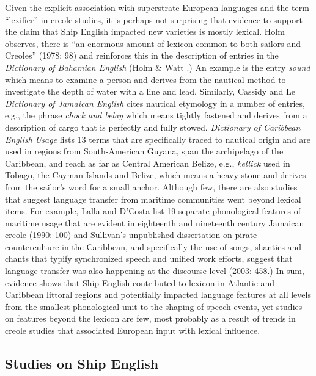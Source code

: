   Given the explicit association with superstrate European languages and the term “lexifier” in creole studies, it is perhaps not surprising that evidence to support the claim that Ship English impacted new varieties is mostly lexical. Holm observes, there is “an enormous amount of lexicon common to both sailors and Creoles” (1978: 98) and reinforces this in the description of entries in the \textit{Dictionary of Bahamian English} (Holm \& Watt \citealt{Schilling1982}.) An example is the entry \textit{sound} which means to examine a person and derives from the nautical method to investigate the depth of water with a line and lead. Similarly, Cassidy and Le  \textit{Dictionary of Jamaican English} cites nautical etymology in a number of entries, e.g., the phrase \textit{chock and belay} which means tightly fastened and derives from a description of cargo that is perfectly and fully stowed.  \textit{Dictionary of Caribbean English Usage} lists 13 terms that are specifically traced to nautical origin and are used in regions from South-American Guyana, span the archipelago of the Caribbean, and reach as far as Central American Belize, e.g., \textit{kellick} used in Tobago, the Cayman Islands and Belize, which means a heavy stone and derives from the sailor’s word for a small anchor. Although few, there are also studies that suggest language transfer from maritime communities went beyond lexical items. For example, Lalla and D’Costa list 19 separate phonological features of maritime usage that are evident in eighteenth and nineteenth century Jamaican creole (1990: 100) and Sullivan’s unpublished dissertation on pirate counterculture in the Caribbean, and specifically the use of songs, shanties and chants that typify synchronized speech and unified work efforts, suggest that language transfer was also happening at the discourse-level (2003: 458.) In sum, evidence shows that Ship English contributed to lexicon in Atlantic and Caribbean littoral regions and potentially impacted language features at all levels from the smallest phonological unit to the shaping of speech events, yet studies on features beyond the lexicon are few, most probably as a result of trends in creole studies that associated European input with lexical influence.  

\subsection{{Studies} {on} {Ship} {English}}%

